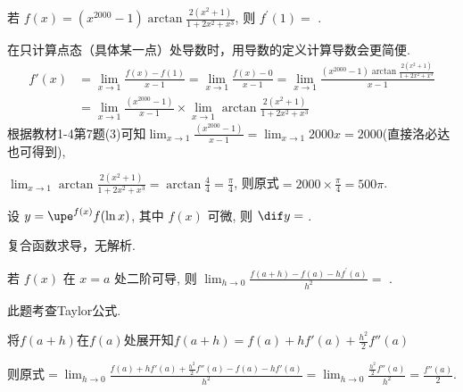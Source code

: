 \documentclass{USTBExam}
\begin{document}
\begin{problem}
  若 $f(x)=\left(x^{2000}-1\right) \arctan \frac{2\left(x^{2}+1\right)}{1+2 x^{2}+x^{3}}$, 则 $f^{\prime}(1)=$
  \fillin[$500 \pi $].
\end{problem}

\begin{analysis}
  在只计算点态（具体某一点）处导数时，用导数的定义计算导数会更简便.
  \begin{align*}
    f'(x) & = \lim_{x \to 1} \frac{f(x) - f(1)}{x - 1} = \lim_{x \to 1} \frac{f(x) - 0}{x - 1} = \lim_{x \to 1} \frac{\left(x^{2000}-1\right) \arctan \frac{2\left(x^{2}+1\right)}{1+2 x^{2}+x^{3}}}{x - 1} \\
          & = \lim_{x \to 1} \frac{\left(x^{2000}-1\right)}{x - 1}
    \times \lim_{x \to 1} \arctan \frac{2\left(x^{2}+1\right)}{1+2 x^{2}+x^{3}}
  \end{align*}
  根据教材1-4第7题(3)可知$\lim_{x \to 1} \frac{\left(x^{2000}-1\right)}{x - 1} = \lim_{x \to 1} 2000x = 2000$(直接洛必达也可得到),

  $\lim_{x \to 1} \arctan \frac{2\left(x^{2}+1\right)}{1+2 x^{2}+x^{3}}$$= \arctan \frac{4}{4} = \frac{\pi}{4}$,
    则原式$=2000 \times \frac{\pi}{4} = 500 \pi$.
\end{analysis}

\begin{problem}
  设 $y=\upe^{f(x)} f(\ln x)$, 其中 $f(x)$ 可微, 则 $ \dif y=$
  .
\end{problem}

\begin{analysis}
  复合函数求导，无解析.
\end{analysis}

\begin{problem}
  若 $f(x)$ 在 $x=a$ 处二阶可导, 则 $\lim _{h \to 0} \frac{f(a+h)-f(a)-h f^{\prime}(a)}{h^{2}}=$
  \fillin[$\frac{1}{2} f''(a) $].
\end{problem}

\begin{analysis}
  此题考查Taylor公式.

  将$f(a+h)$在$f(a)$处展开知$f(a+h) = f(a) + hf'(a)+\frac{h^2}{2}f''(a)$

  则原式$= \lim _{h \to 0} \frac{f(a) + hf'(a)+\frac{h^2}{2}f''(a) - f(a) - hf'(a)}{h^2} = \lim _{h \to 0} \frac{\frac{h^2}{2}f''(a)}{h^2} = \frac{f''(a)}{2}$.
\end{analysis}
\end{document}
